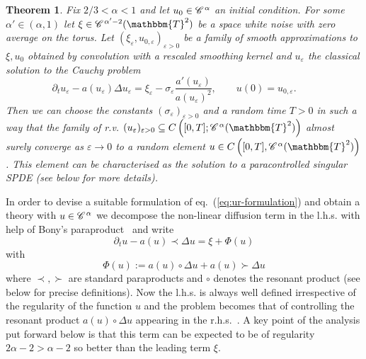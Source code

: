 \documentclass[11pt,reqno]{amsart}
\newcommand{\assign}{:=}
\newtheorem{theorem}{Theorem}
\newcommand{\CC}{\mathscr{C} \hspace{.1em}}
\begin{document}
\begin{theorem}
  Fix $2 / 3 < \alpha < 1$ and let $u_0 \in \CC^{\alpha}$ an initial
  condition. For some $\alpha' \in (\alpha, 1)$ let $\xi \in \CC^{\alpha' - 2}
  (\mathbbm{T}^2)$ be a space white noise with zero average on the torus. Let
  $(\xi_{\varepsilon}, u_{0, \varepsilon})_{\varepsilon > 0}$ be a family of
  smooth approximations to $\xi, u_0$ obtained by convolution with a rescaled
  smoothing kernel and $u_{\varepsilon}$ the classical solution to the Cauchy
  problem
  \begin{equation}
    \partial_t u_{\varepsilon} - a (u_{\varepsilon}) \Delta u_{\varepsilon} =
    \xi_{\varepsilon} - \sigma_{\varepsilon} \frac{a' (u_{\varepsilon})}{a
    (u_{\varepsilon})^2}, \qquad u (0) = u_{0, \varepsilon} . \qquad
    \label{eq:ur-formulation-approx}
  \end{equation}
  Then we can choose the constants $(\sigma_{\varepsilon})_{\varepsilon > 0}$
  and a random time $T > 0$ in such a way that the family of r.v.
  $(u_{\varepsilon})_{\varepsilon > 0} \subseteq C \left( [0, T] ;
  \CC^{\alpha} (\mathbbm{T}^2) \right)$ almost surely converge as $\varepsilon
  \rightarrow 0$ to a random element $u \in C \left( [0, T], \CC^{\alpha}
  (\mathbbm{T}^2) \right)$. This element can be characterised as the solution
  to a paracontrolled singular SPDE (see below for more details).
\end{theorem}

In order to devise a suitable formulation of eq.~(\ref{eq:ur-formulation}) and
obtain a theory with $u \in \CC^{\alpha}$ we decompose the non-linear
diffusion term in the l.h.s. with help of Bony's
paraproduct~{\cite{meyer_remarques_1981}} and write
\begin{equation}
  \partial_t u - a (u) \prec \Delta u = \xi + \Phi (u)
  \label{e:paracontrolled-eq}
\end{equation}
with
\begin{equation}
  \Phi (u) \assign a (u) \circ \Delta u + a (u) \succ \Delta u
  \label{e:def-Phi}
\end{equation}
where $\prec, \succ$ are standard paraproducts and $\circ$ denotes the
resonant product (see below for precise definitions). Now the l.h.s. is always
well defined irrespective of the regularity of the function $u$ and the
problem becomes that of controlling the resonant product $a (u) \circ \Delta
u$ appearing in the r.h.s.~. A key point of the analysis put forward below is
that this term can be expected to be of regularity $2 \alpha - 2 > \alpha - 2$
so better than the leading term $\xi$.
\end{document}
